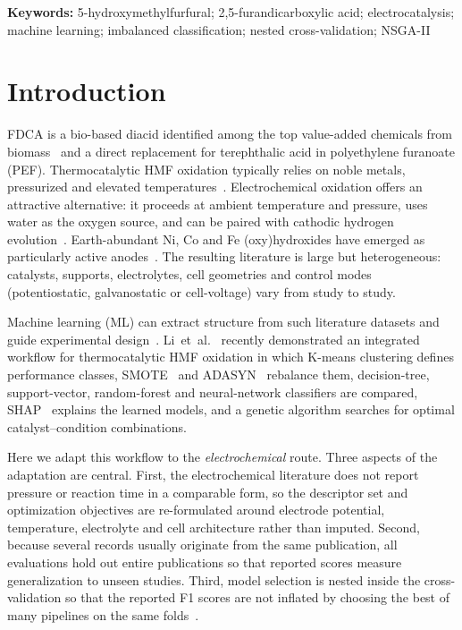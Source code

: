 \documentclass[10pt,a4paper]{article}
\begin{document}
\noindent\textbf{Keywords:} 5-hydroxymethylfurfural; 2,5-furandicarboxylic
acid; electrocatalysis; machine learning; imbalanced classification; nested
cross-validation; NSGA-II

\section{Introduction}
\label{sec:intro}

FDCA is a bio-based diacid identified among the top value-added chemicals from
biomass~\cite{werpy2004top} and a direct replacement for terephthalic acid in
polyethylene furanoate (PEF). Thermocatalytic HMF oxidation typically relies on
noble metals, pressurized  and elevated temperatures~\cite{sajid2018fdca}.
Electrochemical oxidation offers an attractive alternative: it proceeds at
ambient temperature and pressure, uses water as the oxygen source, and can be
paired with cathodic hydrogen evolution~\cite{cha2015combined,you2016simultaneous}.
Earth-abundant Ni, Co and Fe (oxy)hydroxides have emerged as particularly
active anodes~\cite{taitt2019comparative}. The resulting literature is large but
heterogeneous: catalysts, supports, electrolytes, cell geometries and control
modes (potentiostatic, galvanostatic or cell-voltage) vary from study to study.

Machine learning (ML) can extract structure from such literature datasets and
guide experimental design~\cite{butler2018ml}. Li~et~al.~\cite{li2025hmf}
recently demonstrated an integrated workflow for thermocatalytic HMF oxidation
in which K-means clustering defines performance classes, SMOTE~\cite{chawla2002smote}
and ADASYN~\cite{he2008adasyn} rebalance them, decision-tree, support-vector,
random-forest and neural-network classifiers are compared, SHAP~\cite{lundberg2017shap}
explains the learned models, and a genetic algorithm searches for optimal
catalyst--condition combinations.

Here we adapt this workflow to the \emph{electrochemical} route. Three aspects
of the adaptation are central. First, the electrochemical literature does not
report pressure or reaction time in a comparable form, so the descriptor set
and optimization objectives are re-formulated around electrode potential,
temperature, electrolyte and cell architecture rather than imputed. Second,
because several records usually originate from the same publication, all
evaluations hold out entire publications so that reported scores measure
generalization to unseen studies. Third, model selection is nested inside the
cross-validation so that the reported F1 scores are not inflated by choosing
the best of many pipelines on the same folds~\cite{varma2006bias,cawley2010overfitting}.
\end{document}
